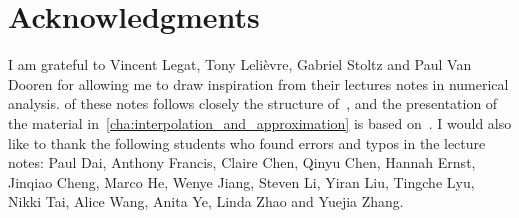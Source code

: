 \chapter*{Acknowledgments}%
\label{cha:acknowledgements}

I am grateful to Vincent Legat, Tony Lelièvre, Gabriel Stoltz and Paul Van Dooren for allowing me to draw inspiration from their lectures notes in numerical analysis.
 of these notes follows closely the structure of~\cite[Chapter 3]{VanDooren},
and the presentation of the material in~\cref{cha:interpolation_and_approximation} is based on~\cite{Legat}.
I would also like to thank the following students who found errors and typos in the lecture notes:
Paul Dai, Anthony Francis, Claire Chen, Qinyu Chen, Hannah Ernst, Jinqiao Cheng, Marco He, Wenye Jiang, Steven Li, Yiran Liu, Tingche Lyu, Nikki Tai, Alice Wang, Anita Ye, Linda Zhao and Yuejia Zhang.
